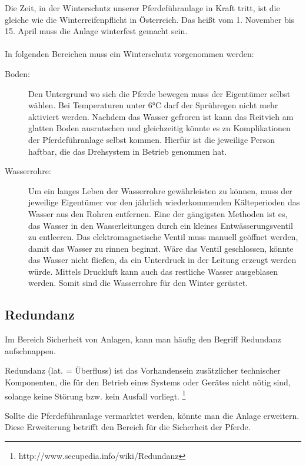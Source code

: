 \documentclass[12pt]{scrreprt} %
\begin{document}
Die Zeit, in der Winterschutz unserer Pferdeführanlage in Kraft tritt, ist die gleiche wie die Winterreifenpflicht in Österreich. Das heißt vom 1. November bis 15. April muss die Anlage winterfest gemacht sein. 
\\
\\
In folgenden Bereichen muss ein Winterschutz vorgenommen werden:
\begin{description}
\item[Boden:]
Den Untergrund wo sich die Pferde bewegen muss der Eigentümer selbst wählen. Bei Temperaturen unter 6°C darf der Sprühregen nicht mehr aktiviert werden. Nachdem das Wasser gefroren ist kann das Reitvieh am glatten Boden ausrutschen und gleichzeitig könnte es zu Komplikationen der Pferdeführanlage selbst kommen. Hierfür ist die jeweilige Person haftbar, die das Drehsystem in Betrieb genommen hat.

\item[Wasserrohre:]

Um ein langes Leben der Wasserrohre gewährleisten zu können, muss der jeweilige Eigentümer vor den jährlich wiederkommenden Kälteperioden das Wasser aus den Rohren entfernen. Eine der gängigsten Methoden ist es, das Wasser in den Wasserleitungen durch ein kleines Entwässerungsventil zu entleeren. Das elektromagnetische Ventil muss manuell geöffnet werden, damit das Wasser zu rinnen beginnt. Wäre das Ventil geschlossen, könnte das Wasser nicht fließen, da ein Unterdruck in der Leitung erzeugt werden würde. Mittels Druckluft kann auch das restliche Wasser ausgeblasen werden. Somit sind die Wasserrohre für den Winter gerüstet.

\end{description}

\subsection{Redundanz}
\label{sec:redundanz}

Im Bereich Sicherheit von Anlagen, kann man häufig den Begriff Redundanz aufschnappen. 

 Redundanz (lat. = Überfluss) ist das Vorhandensein zusätzlicher technischer Komponenten, die für den Betrieb eines Systems oder Gerätes nicht nötig sind, solange keine Störung bzw. kein Ausfall vorliegt. \footnote{http://www.secupedia.info/wiki/Redundanz}

Sollte die Pferdeführanlage vermarktet werden, könnte man die Anlage erweitern. Diese Erweiterung betrifft den Bereich für die Sicherheit der Pferde.
\end{document}
